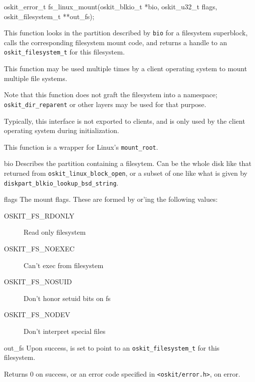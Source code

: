 \begin{apisyn}

	\funcproto oskit_error_t fs_linux_mount(oskit_blkio_t *bio,
                                                oskit_u32_t flags,
                                                oskit_filesystem_t **out_fs);
\end{apisyn}
\ostofs
\begin{apidesc}
        This function looks in the partition described by \texttt{bio}
        for a filesystem superblock, calls the corresponding
        filesystem mount code,
        and returns a handle to an \texttt{oskit_filesystem_t} for
        this filesystem.

	This function may be used multiple times by a client
	operating system to mount multiple file systems.

	Note that this function does not graft the filesystem
	into a namespace;  {\tt oskit_dir_reparent} or other layers
	may be used for that purpose.

	Typically, this interface is not exported to clients,
	and is only used by the client operating system
	during initialization.

        This function is a wrapper for Linux's \texttt{mount_root}.
\end{apidesc}
\begin{apiparm}
        \item[bio]
              Describes the partition containing a filesytem.
              Can be the whole disk like that returned from
              \texttt{oskit_linux_block_open},
              or a subset of one like what is given by
              \texttt{diskpart_blkio_lookup_bsd_string}.

        \item[flags]
              The mount flags.
              These are formed by or'ing the following values:
              \begin{description}
                \item[OSKIT_FS_RDONLY] Read only filesystem
                \item[OSKIT_FS_NOEXEC] Can't exec from filesystem
                \item[OSKIT_FS_NOSUID] Don't honor setuid bits on fs
                \item[OSKIT_FS_NODEV]  Don't interpret special files
              \end{description}

        \item[out_fs]
              Upon success, is set to point to an \texttt{oskit_filesystem_t}
              for this filesystem.
\end{apiparm}
\begin{apiret}
	Returns 0 on success, or an error code specified in
	{\tt <oskit/error.h>}, on error.
\end{apiret}
